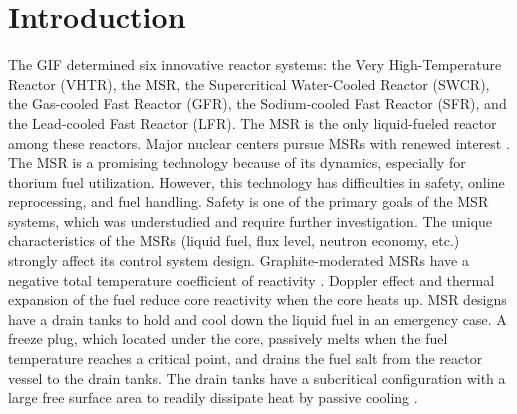 \section{Introduction} \label{Introduction}

The \gls{GIF} \cite{doe2002technology} determined six innovative reactor 
systems: the Very High-Temperature Reactor (VHTR), the \gls{MSR}, the 
Supercritical Water-Cooled Reactor (SWCR), the Gas-cooled Fast Reactor (GFR), 
the Sodium-cooled Fast Reactor (SFR), and the Lead-cooled Fast Reactor (LFR). 
The MSR is the only liquid-fueled reactor among these reactors. Major nuclear 
centers pursue MSRs with renewed interest \cite{betzler_impacts_2019, 
ashraf2020whole,betzler2016modeling,mohsin2019safety,zhang2020radiotoxicity}.
The MSR is a promising technology because of its dynamics, especially for 
thorium fuel utilization. However, this technology has difficulties in safety, 
online reprocessing, and fuel handling. Safety is one of the primary goals of 
the MSR systems, which was understudied and require further investigation. The 
unique characteristics of the MSRs (liquid fuel, flux level, neutron economy, 
etc.) strongly affect its control system design. Graphite-moderated MSRs have 
a negative total temperature coefficient of reactivity 
\cite{ashraf2020whole,robertson_conceptual_1971,nuttin2005potential,rykhlevskii2019modeling,li_optimization_2018}.
Doppler effect and thermal expansion of the fuel reduce core reactivity when 
the core heats up. MSR designs have a drain tanks to 
hold and cool down the liquid fuel in an emergency case. A freeze plug, which 
located under the core, passively melts when the fuel temperature reaches a 
critical point, and drains the fuel salt from the reactor vessel to the drain 
tanks. The drain tanks have a subcritical
configuration with a large free 
surface area to readily dissipate heat by passive cooling 
\cite{elsheikh2013safety}.

